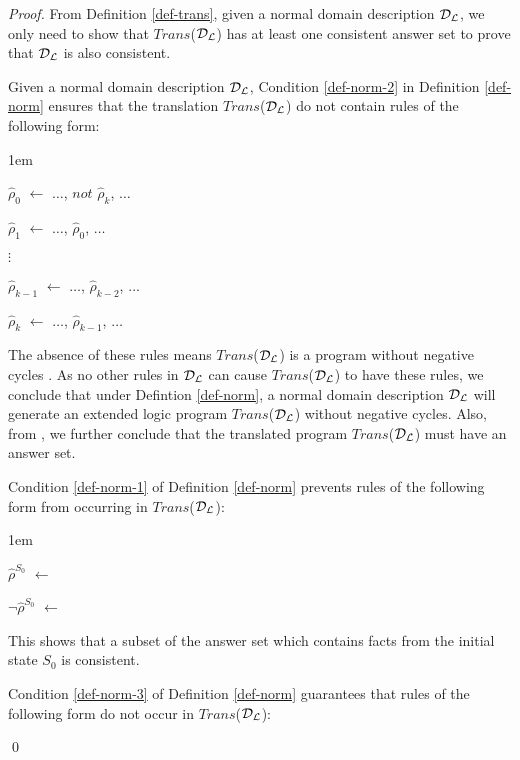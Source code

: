 \documentclass[global,twocolumn,final]{svjour}
\newenvironment{vproof}
  {\begin{proof}\hspace{0.25em}}
  {\qed\end{proof}}
\newenvironment{vquote}
  {\begin{list}{}{\leftmargin 1em}\item[]}
  {\end{list}}
\begin{document}
    \begin{vproof}
      From Definition \ref{def-trans}, given a normal domain description
      ${\cal D}_{\cal L}$, we only need to show that
      $Trans$(${\cal D}_{\cal L}$) has at least one consistent answer set to
      prove that ${\cal D}_{\cal L}$ is also consistent.

      Given a normal domain description ${\cal D}_{\cal L}$, Condition
      \ref{def-norm-2} in Definition \ref{def-norm} ensures that the
      translation $Trans$(${\cal D}_{\cal L}$) do not contain rules of the
      following form:

      \begin{vquote}
        $\hat{\rho}_{0}$ $\leftarrow$ $\hdots$, $not$ $\hat{\rho}_{k}$, $\hdots$

        $\hat{\rho}_{1}$ $\leftarrow$ $\hdots$, $\hat{\rho}_{0}$, $\hdots$

        $\vdots$

        $\hat{\rho}_{k - 1}$ $\leftarrow$ $\hdots$, $\hat{\rho}_{k - 2}$, $\hdots$

        $\hat{\rho}_{k}$ $\leftarrow$ $\hdots$, $\hat{\rho}_{k - 1}$, $\hdots$
      \end{vquote}

      The absence of these rules means $Trans$(${\cal D}_{\cal L}$) is a
      program without negative cycles \cite{LIN}. As no other rules in
      ${\cal D}_{\cal L}$ can cause $Trans$(${\cal D}_{\cal L}$) to have these
      rules, we conclude that under Defintion \ref{def-norm}, a normal domain
      description ${\cal D}_{\cal L}$ will generate an extended logic program
      $Trans$(${\cal D}_{\cal L}$) without negative cycles. Also, from
      \cite{BAR,LIN}, we further conclude that the translated program
      $Trans$(${\cal D}_{\cal L}$) must have an answer set.

      Condition \ref{def-norm-1} of Definition \ref{def-norm} prevents rules
      of the following form from occurring in $Trans$(${\cal D}_{\cal L}$):

      \begin{vquote}
        $\hat{\rho}^{S_{0}}$ $\leftarrow$

        $\lnot\hat{\rho}^{S_{0}}$ $\leftarrow$
      \end{vquote}

      \noindent
      This shows that a subset of the answer set which contains facts from the
      initial state $S_{0}$ is consistent.

      Condition \ref{def-norm-3} of Definition \ref{def-norm} guarantees that
      rules of the following form do not occur in $Trans$(${\cal D}_{\cal L}$):


\end{vproof}
\end{document}
